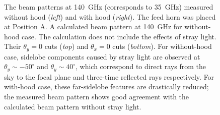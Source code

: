 \documentclass[journal]{IEEEtran}
\begin{document}
\begin{figure}[!t]
{\label{fig:Hood_F1_140G_cut}}
\caption{%
\protect{} The beam patterns at 140~GHz (corresponds to 35~GHz) measured without hood (\textit{left}) and with hood (\textit{right}). The feed horn was placed at Position A.
\protect{} A calculated beam pattern at 140~GHz for without-hood case. The calculation does not include the effects of stray light.
\protect{} Their $\theta_y = 0$ cuts (\textit{top}) and $\theta_x = 0$ cuts (\textit{bottom}). For without-hood case, sidelobe components caused by stray light are observed at $\theta_y \sim -50^\circ$ and $\theta_y \sim 40^\circ$, which correspond to direct rays from the sky to the focal plane and three-time reflected rays respectively. For with-hood case, these far-sidelobe features are drastically reduced; the measured beam pattern shows good agreement with the calculated beam pattern without stray light.
}
\label{fig:Hood_F1_140G}
\end{figure}
%
\end{document}
